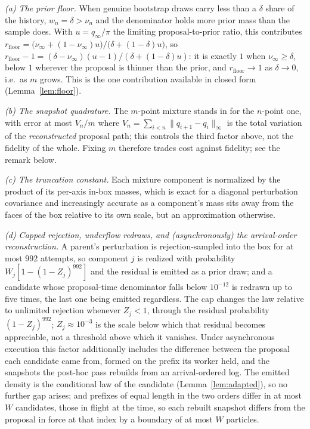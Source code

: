 \documentclass[10pt]{article}
\theoremstyle{plain}
\theoremstyle{definition}
\begin{document}
\emph{(a) The prior floor.} When genuine bootstrap draws carry less than a $\delta$ share of the history, $w_n=\delta>\nu_n$ and the denominator holds more prior mass than the sample does. With $u=q_\infty/\pi$ the limiting proposal-to-prior ratio, this contributes
$r_{\mathrm{floor}}=\bigl(\nu_\infty+(1-\nu_\infty)u\bigr)/\bigl(\delta+(1-\delta)u\bigr)$, so $r_{\mathrm{floor}}-1=(\delta-\nu_\infty)(u-1)/(\delta+(1-\delta)u)$: it is exactly $1$ when $\nu_\infty\ge\delta$, below $1$ wherever the proposal is thinner than the prior, and $r_{\mathrm{floor}}\to1$ as $\delta\to0$, i.e.\ as $m$ grows. This is the one contribution available in closed form (Lemma~\ref{lem:floor}).

\emph{(b) The snapshot quadrature.} The $m$-point mixture stands in for the $n$-point one, with error at most $V_n/m$ where $V_n=\sum_{i<n}\|q_{i+1}-q_i\|_\infty$ is the total variation of the \emph{reconstructed} proposal path; this controls the third factor above, not the fidelity of the whole. Fixing $m$ therefore trades cost against fidelity; see the remark below.

\emph{(c) The truncation constant.} Each mixture component is normalized by the product of its per-axis in-box masses, which is exact for a diagonal perturbation covariance and increasingly accurate as a component's mass sits away from the faces of the box relative to its own scale, but an approximation otherwise.

\emph{(d) Capped rejection, underflow redraws, and (asynchronously) the arrival-order reconstruction.} A parent's perturbation is rejection-sampled into the box for at most $992$ attempts, so component $j$ is realized with probability $W_j[1-(1-Z_j)^{992}]$ and the residual is emitted as a prior draw; and a candidate whose proposal-time denominator falls below $10^{-12}$ is redrawn up to five times, the last one being emitted regardless. The cap changes the law relative to unlimited rejection whenever $Z_j<1$, through the residual probability $(1-Z_j)^{992}$; $Z_j\approx10^{-3}$ is the scale below which that residual becomes appreciable, not a threshold above which it vanishes. Under asynchronous execution this factor additionally includes the difference between the proposal each candidate came from, formed on the prefix its worker held, and the snapshots the post-hoc pass rebuilds from an arrival-ordered log. The emitted density is the conditional law of the candidate (Lemma~\ref{lem:adapted}), so no further gap arises; and prefixes of equal length in the two orders differ in at most $W$ candidates, those in flight at the time, so each rebuilt snapshot differs from the proposal in force at that index by a boundary of at most $W$ particles.
\end{document}
